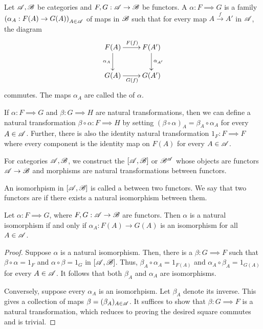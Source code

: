 \begin{definition}
    Let $\mathscr A,\mathscr B$ be categories and $F, G:\mathscr A\to\mathscr B$ be functors. A  $\alpha: F\implies G$ is a family $\left(\alpha_A: F(A)\to G(A)\right)_{A\in\mathscr A}$ of maps in $\mathscr B$ such that for every map $A\xrightarrow{f} A'$ in $\mathscr A$, the diagram 
    \begin{equation*}
        \xymatrix {
            F(A)\ar[r]^{F(f)}\ar[d]_{\alpha_A} & F(A')\ar[d]^{\alpha_{A'}}\\
            G(A)\ar[r]_{G(f)} & G(A')
        }
    \end{equation*}
    commutes. The maps $\alpha_A$ are called the  of $\alpha$.
\end{definition}

If $\alpha: F\implies G$ and $\beta: G\implies H$ are natural transformations, then we can define a natural transformation $\beta\circ\alpha: F\implies H$ by setting $(\beta\circ\alpha)_A = \beta_A\circ\alpha_A$ for every $A\in\mathscr A$. Further, there is also the identity natural transformation $1_F: F\implies F$ where every component is the identity map on $F(A)$ for every $A\in\mathscr A$.

\begin{definition}
    For categories $\mathscr A, \mathscr B$, we construct the  $[\mathscr A,\mathscr B]$ or $\mathscr B^{\mathscr A}$ whose objects are functors $\mathscr A\to\mathscr B$ and morphisms are natural transformations between functors. 
    
    An isomorhpism in $[\mathscr A,\mathscr B]$ is called a  between two functors. We say that two functors are  if there exists a natural isomorphism between them.
\end{definition}

\begin{lemma}
    Let $\alpha:F\implies G$, where $F,G:\mathscr A\to\mathscr B$ are functors. Then $\alpha$ is a natural isomorphism if and only if $\alpha_A: F(A)\to G(A)$ is an isomorphism for all $A\in\mathscr A$.
\end{lemma}
\begin{proof}
    Suppose $\alpha$ is a natural isomorphism. Then, there is a $\beta: G\implies F$ such that $\beta\circ\alpha = 1_F$ and $\alpha\circ\beta = 1_G$ in $[\mathscr A,\mathscr B]$. Thus, $\beta_A\circ\alpha_A = 1_{F(A)}$ and $\alpha_A\circ\beta_A = 1_{G(A)}$ for every $A\in\mathscr A$. It follows that both $\beta_A$ and $\alpha_A$ are isomorphisms.

    Conversely, suppose every $\alpha_A$ is an isomorhpism. Let $\beta_A$ denote its inverse. This gives a collection of maps $\beta = (\beta_A)_{A\in\mathscr A}$. It suffices to show that $\beta: G\implies F$ is a natural transformation, which reduces to proving the desired square commutes and is trivial.
\end{proof}

